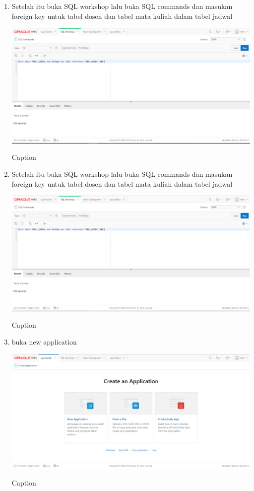 ﻿\documentclass{article}
\begin{document}
\begin{enumerate}
                    \item Setelah itu buka SQL workshop lalu buka SQL commands dan masukan foreign key untuk tabel dosen dan tabel mata kuliah dalam tabel jadwal
    \begin{center}
        \centering
        \includegraphics[scale=0.4]{figures/12.PNG}
        \caption{Caption}
        \label{fig:my_label}
    \end{center}
    
                        \item Setelah itu buka SQL workshop lalu buka SQL commands dan masukan foreign key untuk tabel dosen dan tabel mata kuliah dalam tabel jadwal
    \begin{center}
        \centering
        \includegraphics[scale=0.4]{figures/12.PNG}
        \caption{Caption}
        \label{fig:my_label}
    \end{center}
    
                            \item buka new application
    \begin{center}
        \centering
        \includegraphics[scale=0.4]{figures/13.PNG}
        \caption{Caption}
        \label{fig:my_label}
    \end{center}
    

\end{enumerate}
\end{document}

